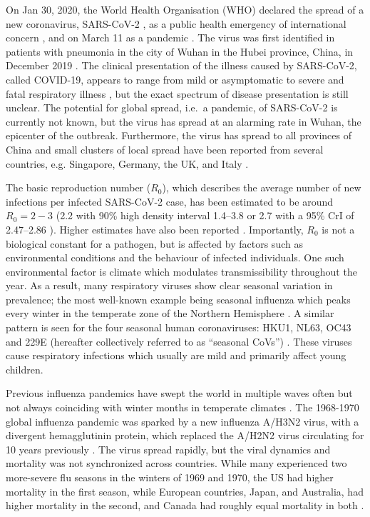 \documentclass[rmp, reprint, superscriptaddress, floatfix,amsmath]{revtex4-1}
\begin{document}
On Jan 30, 2020, the World Health Organisation (WHO) declared the spread of a new coronavirus, SARS-CoV-2 \citep{ICTV_SARS-CoV-2}, as a public health emergency of international concern \citep{WHO_statement}, and on March 11 as a pandemic \citep{WHOpandemic}.
The virus was first identified in patients with pneumonia in the city of Wuhan in the Hubei province, China, in December 2019 \citep{Liangjun2020rna}.
The clinical presentation of the illness caused by SARS-CoV-2, called COVID-19, appears to range from mild or asymptomatic to severe and fatal respiratory illness \citep{WHO_China2020joint}, but the exact spectrum of disease presentation is still unclear.
The potential for global spread, i.e.~a pandemic, of SARS-CoV-2 is currently not known, but the virus has spread at an alarming rate in Wuhan, the epicenter of the outbreak. Furthermore, the virus has spread to all provinces of China and small clusters of local spread have been reported from several countries, e.g. Singapore, Germany, the UK, and Italy \citep{WHO_situation_report23, rothe2020transmission, MOH_Singapore, ECDC_report9March}.

The basic reproduction number ($R_0$), which describes the average number of new infections per infected SARS-CoV-2 case, has been estimated to be around $R_0 = 2 - 3$ (2.2  with 90\% high density interval 1.4–3.8 \citep{Riou2020pattern} or 2.7 with a 95\% CrI of 2.47–2.86 \citep{wu_nowcasting_2020}).
Higher estimates have also been reported \citep{yang_epidemiological_2020,sanche_novel_2020}. Importantly, $R_0$ is not a biological constant for a pathogen, but is affected by factors such as environmental conditions and the behaviour of infected individuals. One such environmental factor is climate which modulates transmissibility throughout the year.
As a result, many respiratory viruses show clear seasonal variation in prevalence; the most well-known example being seasonal influenza which peaks every winter in the temperate zone of the Northern Hemisphere \citep{petrova_evolution_2018}.
A similar pattern is seen for the four seasonal human coronaviruses: HKU1, NL63, OC43 and 229E (hereafter collectively referred to as ``seasonal CoVs'') \citep{killerby2018human,goes2019typical,galanti2019longitudinal,friedman2018human,al2016diversity,huang2017epidemiology}.
These viruses cause respiratory infections which usually are mild and primarily affect young children.

Previous influenza pandemics have swept the world in multiple waves often but not always coinciding with winter months in temperate climates \citep{taubenberger_1918_2019,viboud_multinational_2005,viboud_global_2016,amato-gauci_surveillance_2011}.
The 1968-1970 global influenza pandemic was sparked by a new influenza A/H3N2 virus, with a divergent hemagglutinin protein, which replaced the A/H2N2 virus circulating for 10 years previously \citep{viboud_multinational_2005}. The virus spread rapidly, but the viral dynamics and mortality was not synchronized across countries.
While many experienced two more-severe flu seasons in the winters of 1969 and 1970, the US had higher mortality in the first season, while European countries, Japan, and Australia, had higher mortality in the second, and Canada had roughly equal mortality in both \citep{viboud_multinational_2005}.
\end{document}
